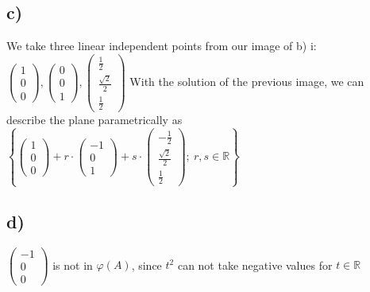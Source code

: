 \documentclass{article}
\newcommand{\R}[0]{\mathbb{R}}
\begin{document}
\subsection*{c)}
We take three linear independent points from our image of b) i:
$\left( \begin{array}{c}1 \\ 0 \\ 0 \end{array} \right), \left( \begin{array}{c}0 \\ 0 \\ 1 \end{array} \right), \left( \begin{array}{c} \frac{1}{2} \\ \frac{\sqrt{2}}{2} \\ \frac{1}{2} \end{array} \right)$ 
With the solution of the previous image, we can describe the plane parametrically as $\left\{ \left( \begin{array}{c}1 \\ 0 \\ 0 \end{array} \right) + r \cdot \left( \begin{array}{c}-1 \\ 0 \\ 1 \end{array} \right) + s \cdot \left( \begin{array}{c} - \frac{1}{2} \\ \frac{\sqrt{2}}{2} \\ \frac{1}{2} \end{array} \right) ;\ r,s \in \R \right\}$  
\subsection*{d)}
$\left( \begin{array}{c}-1 \\ 0 \\0 \end{array} \right)$ is not in $\varphi (A)$, since $t^2$ can not take negative values for $t \in \R$
\end{document}
